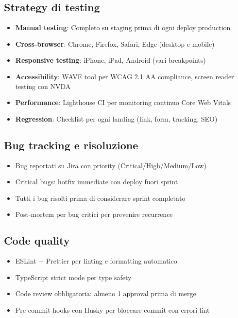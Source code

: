 \subsection{Strategy di testing}
\begin{itemize}
  \item \textbf{Manual testing}: Completo su staging prima di ogni 
        deploy production
  \item \textbf{Cross-browser}: Chrome, Firefox, Safari, Edge (desktop 
        e mobile)
  \item \textbf{Responsive testing}: iPhone, iPad, Android (vari 
        breakpoints)
  \item \textbf{Accessibility}: WAVE tool per WCAG 2.1 AA compliance, 
        screen reader testing con NVDA
  \item \textbf{Performance}: Lighthouse CI per monitoring continuo 
        Core Web Vitals
  \item \textbf{Regression}: Checklist per ogni landing (link, form, 
        tracking, SEO)
\end{itemize}

\subsection{Bug tracking e risoluzione}
\begin{itemize}
  \item Bug reportati su Jira con priority (Critical/High/Medium/Low)
  \item Critical bugs: hotfix immediate con deploy fuori sprint
  \item Tutti i bug risolti prima di considerare sprint completato
  \item Post-mortem per bug critici per prevenire recurrence
\end{itemize}

\subsection{Code quality}
\begin{itemize}
  \item ESLint + Prettier per linting e formatting automatico
  \item TypeScript strict mode per type safety
  \item Code review obbligatoria: almeno 1 approval prima di merge
  \item Pre-commit hooks con Husky per bloccare commit con errori lint
\end{itemize}